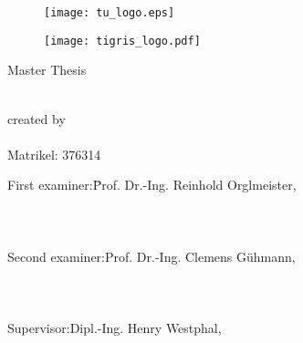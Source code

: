 \begin{titlepage}
\begin{centering}
	\begin{figure}[!h]
		\begin{center}
			\texttt{[image: tu\_logo.eps]}
		\end{center}
	\end{figure}
	\begin{figure}[!h]
			\begin{center}
				\texttt{[image: tigris\_logo.pdf]}
			\end{center}
	\end{figure}


	\vspace{10mm}

	\LARGE

	Master Thesis

	\textbf{\Title}\\[1cm]


	\large
	created by\\
	\Author\\
	Matrikel: 376314\\[1cm]

	\hspace*{-1.5cm}
	\begin{minipage}{\linewidth}
		\begin{tabbing}
    	First examiner:\qquad \= Prof. Dr.-Ing. Reinhold Orglmeister,\\
			\\
			\\
			\\
    	Second examiner:\>Prof. Dr.-Ing. Clemens Gühmann,\\
			\\
			\\
			\\
    	Supervisor:\>Dipl.-Ing. Henry Westphal,\\
  	\end{tabbing}
  \end{minipage}

	\vspace{20mm}

	\normalsize

	\Date\\
\end{centering}
\end{titlepage}

